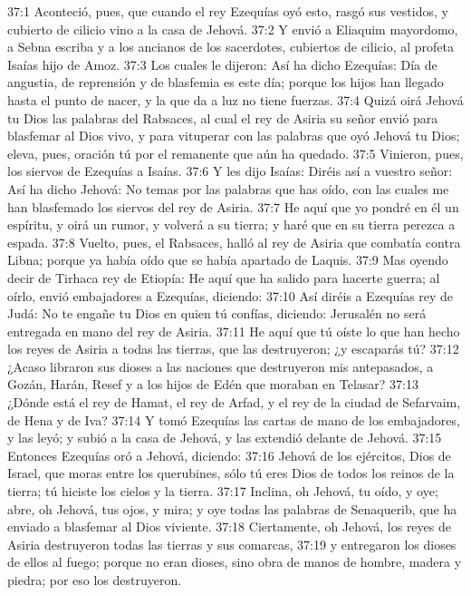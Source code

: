 37:1 Aconteció, pues, que cuando el rey Ezequías oyó esto, rasgó sus vestidos, y cubierto de cilicio vino a la casa de Jehová. 
37:2 Y envió a Eliaquim mayordomo, a Sebna escriba y a los ancianos de los sacerdotes, cubiertos de cilicio, al profeta Isaías hijo de Amoz. 
37:3 Los cuales le dijeron: Así ha dicho Ezequías: Día de angustia, de reprensión y de blasfemia es este día; porque los hijos han llegado hasta el punto de nacer, y la que da a luz no tiene fuerzas. 
37:4 Quizá oirá Jehová tu Dios las palabras del Rabsaces, al cual el rey de Asiria su señor envió para blasfemar al Dios vivo, y para vituperar con las palabras que oyó Jehová tu Dios; eleva, pues, oración tú por el remanente que aún ha quedado. 
37:5 Vinieron, pues, los siervos de Ezequías a Isaías. 
37:6 Y les dijo Isaías: Diréis así a vuestro señor: Así ha dicho Jehová: No temas por las palabras que has oído, con las cuales me han blasfemado los siervos del rey de Asiria. 
37:7 He aquí que yo pondré en él un espíritu, y oirá un rumor, y volverá a su tierra; y haré que en su tierra perezca a espada. 
37:8 Vuelto, pues, el Rabsaces, halló al rey de Asiria que combatía contra Libna; porque ya había oído que se había apartado de Laquis. 
37:9 Mas oyendo decir de Tirhaca rey de Etiopía: He aquí que ha salido para hacerte guerra; al oírlo, envió embajadores a Ezequías, diciendo: 
37:10 Así diréis a Ezequías rey de Judá: No te engañe tu Dios en quien tú confías, diciendo: Jerusalén no será entregada en mano del rey de Asiria. 
37:11 He aquí que tú oíste lo que han hecho los reyes de Asiria a todas las tierras, que las destruyeron; ¿y escaparás tú? 
37:12 ¿Acaso libraron sus dioses a las naciones que destruyeron mis antepasados, a Gozán, Harán, Resef y a los hijos de Edén que moraban en Telasar? 
37:13 ¿Dónde está el rey de Hamat, el rey de Arfad, y el rey de la ciudad de Sefarvaim, de Hena y de Iva? 
37:14 Y tomó Ezequías las cartas de mano de los embajadores, y las leyó; y subió a la casa de Jehová, y las extendió delante de Jehová. 
37:15 Entonces Ezequías oró a Jehová, diciendo: 
37:16 Jehová de los ejércitos, Dios de Israel, que moras entre los querubines, sólo tú eres Dios de todos los reinos de la tierra; tú hiciste los cielos y la tierra. 
37:17 Inclina, oh Jehová, tu oído, y oye; abre, oh Jehová, tus ojos, y mira; y oye todas las palabras de Senaquerib, que ha enviado a blasfemar al Dios viviente. 
37:18 Ciertamente, oh Jehová, los reyes de Asiria destruyeron todas las tierras y sus comarcas, 
37:19 y entregaron los dioses de ellos al fuego; porque no eran dioses, sino obra de manos de hombre, madera y piedra; por eso los destruyeron. 
